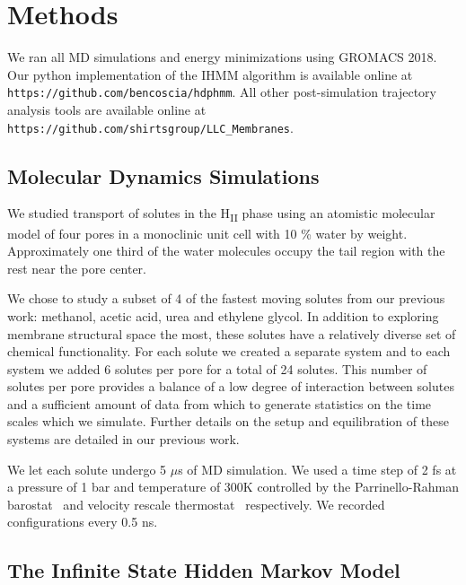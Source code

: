 \documentclass[journal=jpcbfk,manuscript=article]{achemso}
\begin{document}
  \section{Methods}
    
  We ran all MD simulations and energy minimizations using GROMACS 2018.
  ~\cite{bekker_gromacs:_1993,berendsen_gromacs:_1995,van_der_spoel_gromacs:_2005,hess_gromacs_2008}  
  Our python implementation of the IHMM algorithm is available online at \\
  \texttt{https://github.com/bencoscia/hdphmm}. All other post-simulation 
  trajectory analysis tools are available online at
  \texttt{https://github.com/shirtsgroup/LLC\_Membranes}.

  \subsection{Molecular Dynamics Simulations}

  We studied transport of solutes in the H\textsubscript{II} phase using an
  atomistic molecular model of four pores in a monoclinic unit cell with 
  10 \% water by weight. Approximately one third of the water molecules 
  occupy the tail region with the rest near the pore center.
  
  We chose to study a subset of 4 of the fastest moving solutes from our previous
  work: methanol, acetic acid, urea and ethylene glycol.
  In addition to exploring membrane structural space the most, these solutes have a
  relatively diverse set of chemical functionality. For each solute we created a 
  separate system and to 
  each system we added 6 solutes per pore for a total of 24 solutes. This number 
  of solutes per pore provides a balance of a low degree of interaction between 
  solutes and a sufficient amount of data from which to generate statistics on the
  time scales which we simulate. Further details on the setup and equilibration of
  these systems are detailed in our previous work.\cite{coscia_chemically_2019}
  
  We let each solute undergo 5 $\mu$s of MD simulation. We used a time step of 2 fs
  at a pressure of 1 bar and temperature of 300K controlled by the Parrinello-Rahman 
  barostat~\cite{parrinello_polymorphic_1981} and velocity rescale 
  thermostat~\cite{bussi_canonical_2007} respectively. We recorded configurations every 0.5 ns.

  \subsection{The Infinite State Hidden Markov Model}\label{method:IHMM}
  
\end{document}
